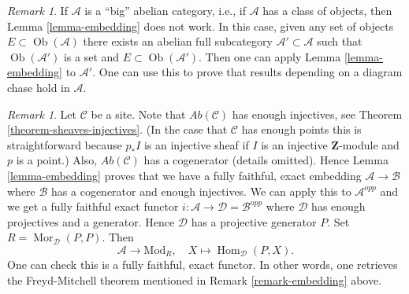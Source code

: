 \documentclass{stacks-project}
\theoremstyle{plain}
\theoremstyle{definition}
\theoremstyle{remark}
\newtheorem{remark}[subsection]{Remark}
\numberwithin{equation}{subsection}
\def\Hom{\mathop{\mathrm{Hom}}\nolimits}
\def\Mor{\mathop{\mathrm{Mor}}\nolimits}
\def\Ob{\mathop{\mathrm{Ob}}\nolimits}
\begin{document}
\begin{remark}
\label{remark-embedding-big}
If $\mathcal{A}$ is a ``big'' abelian category, i.e., if $\mathcal{A}$
has a class of objects, then
Lemma \ref{lemma-embedding}
does not work. In this case, given any set of objects
$E \subset \Ob(\mathcal{A})$ there exists an abelian full subcategory
$\mathcal{A}' \subset \mathcal{A}$ such that
$\Ob(\mathcal{A}')$ is a set and $E \subset \Ob(\mathcal{A}')$.
Then one can apply
Lemma \ref{lemma-embedding}
to $\mathcal{A}'$. One can use this to prove that results depending on
a diagram chase hold in $\mathcal{A}$.
\end{remark}

\begin{remark}
\label{remark-embedding-freyd}
Let $\mathcal{C}$ be a site.
Note that $\textit{Ab}(\mathcal{C})$ has enough injectives, see
Theorem \ref{theorem-sheaves-injectives}.
(In the case that $\mathcal{C}$ has enough points this is straightforward
because  $p_*I$ is an injective sheaf if $I$ is an injective
$\mathbf{Z}$-module and $p$ is a point.)
Also, $\textit{Ab}(\mathcal{C})$ has a cogenerator (details omitted).
Hence
Lemma \ref{lemma-embedding}
proves that we have a fully faithful, exact embedding
$\mathcal{A} \to \mathcal{B}$ where $\mathcal{B}$ has a
cogenerator and enough injectives.
We can apply this to $\mathcal{A}^{opp}$ and we get a
fully faithful exact functor
$i : \mathcal{A} \to \mathcal{D} = \mathcal{B}^{opp}$
where $\mathcal{D}$ has enough projectives and a generator. Hence
$\mathcal{D}$ has a projective generator $P$.
Set $R = \Mor_\mathcal{D}(P, P)$. Then
$$
\mathcal{A} \longrightarrow \text{Mod}_R, \quad
X \longmapsto \Hom_\mathcal{D}(P, X).
$$
One can check this is a fully faithful, exact functor.
In other words, one retrieves the
Freyd-Mitchell theorem mentioned in
Remark \ref{remark-embedding}
above.
\end{remark}
\end{document}

